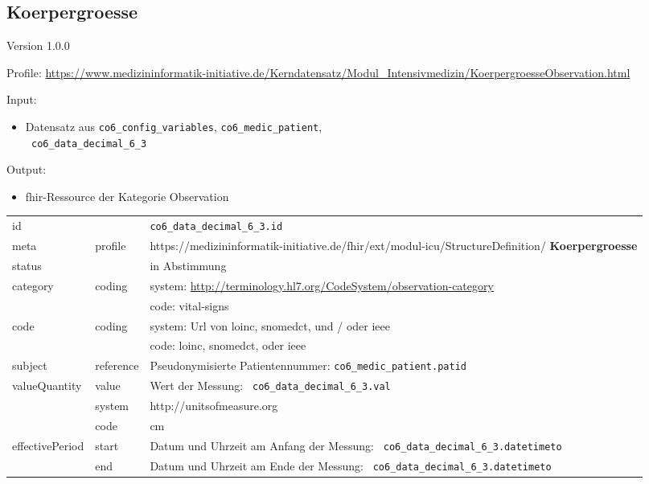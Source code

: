 \subsection{
Koerpergroesse} 
\noindent Version 1.0.0

\noindent Profile: \url{https://www.medizininformatik-initiative.de/Kerndatensatz/Modul_Intensivmedizin/KoerpergroesseObservation.html}

\noindent Input:
\begin{itemize}
	\item Datensatz aus \texttt{co6\_config\_variables}, \texttt{co6\_medic\_patient}, \\ \texttt{
co6\_data\_decimal\_6\_3}
\end{itemize}
Output:
\begin{itemize}
        \item \ac{fhir}-Ressource der Kategorie \glqq Observation\grqq{}
\end{itemize}
\begin{longtable}{|l|l|p{7.5cm}|}
        \hline
        \rowcolor{lightgray} \multicolumn{3}{|l|}{Data Mapping (inhaltlich)} \\ \hline
        id &  & \texttt{co6\_data\_decimal\_6\_3.id} \\ \hline
	meta & profile & https://medizininformatik-initiative.de/fhir/ext/modul-icu/StructureDefinition/\textbf{
Koerpergroesse} \\ \hline 
	status &  & in Abstimmung  \\ \hline 
	category & coding & system: \url{http://terminology.hl7.org/CodeSystem/observation-category} \\
\cline{3-3}
	& & code: vital-signs \\ \hline
	code & coding & system: Url von \ac{loinc}, \ac{snomedct}, und / oder \ac{ieee} \\ 
	\cline{3-3} 
	 &  & code: \ac{loinc}, \ac{snomedct}, oder \ac{ieee} \\ \hline
	subject & reference & Pseudonymisierte Patientennummer: \texttt{co6\_medic\_patient.patid} \\ \hline
	valueQuantity & value & Wert der Messung: \texttt{
co6\_data\_decimal\_6\_3.val} \\
        \cline{2-3}
         & system & http://unitsofmeasure.org \\
         \cline{2-3}
         & code & cm \\ \hline
    effectivePeriod & start & Datum und Uhrzeit am Anfang der Messung: \texttt{
co6\_data\_decimal\_6\_3.datetimeto} \\
    \cline{2-3}
     & end & Datum und Uhrzeit am Ende der Messung: \texttt{
co6\_data\_decimal\_6\_3.datetimeto} \\ \hline
\end{longtable}


